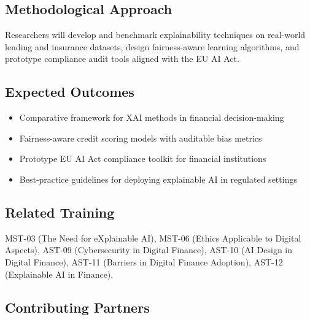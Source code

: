 \subsection*{Methodological Approach}

Researchers will develop and benchmark explainability techniques on real-world
lending and insurance datasets, design fairness-aware learning algorithms, and
prototype compliance audit tools aligned with the EU AI Act.

\subsection*{Expected Outcomes}
\begin{itemize}[nosep]
  \item Comparative framework for XAI methods in financial decision-making
  \item Fairness-aware credit scoring models with auditable bias metrics
  \item Prototype EU AI Act compliance toolkit for financial institutions
  \item Best-practice guidelines for deploying explainable AI in regulated
        settings
\end{itemize}

\subsection*{Related Training}
MST-03 (The Need for eXplainable AI), MST-06 (Ethics Applicable to Digital Aspects),
AST-09 (Cybersecurity in Digital Finance), AST-10 (AI Design in Digital Finance),
AST-11 (Barriers in Digital Finance Adoption), AST-12 (Explainable AI in Finance).

\subsection*{Contributing Partners}
\begin{center}
\hspace{3mm}%
\hspace{3mm}%
\end{center}

\newpage



